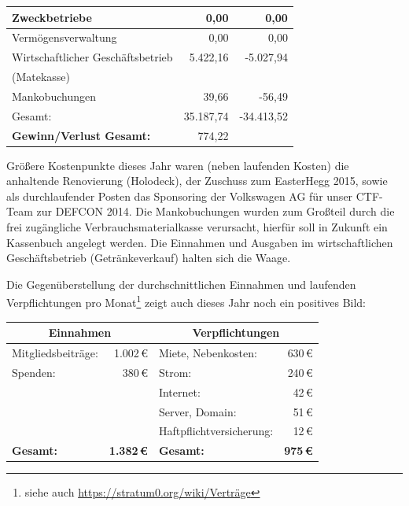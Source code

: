 \documentclass[a4paper,12pt]{scrartcl}
\begin{document}
\begin{longtable}{|l|r|r|}
  \hline
  Zweckbetriebe                     &        0{,}00 &         0{,}00 \\
  \hline
  Vermögensverwaltung               &        0{,}00 &         0{,}00 \\
  \hline
  Wirtschaftlicher Geschäftsbetrieb &  5{.}422{,}16 &  -5{.}027{,}94 \\
  \quad (Matekasse) && \\
  \hline
  Mankobuchungen                    &       39{,}66 &       -56{,}49 \\
  \hline
  Gesamt:                           & 35{.}187{,}74 & -34{.}413{,}52 \\
  \hline\hline
  \textbf{Gewinn/Verlust Gesamt:}   &      774{,}22 &                \\
  \hline
\end{longtable}

Größere Kostenpunkte dieses Jahr waren (neben laufenden Kosten) die anhaltende
Renovierung (Holodeck), der Zuschuss zum EasterHegg 2015, sowie als
durchlaufender Posten das Sponsoring der Volkswagen AG für unser CTF-Team zur
DEFCON 2014.  Die Mankobuchungen wurden zum Großteil durch die frei zugängliche
Verbrauchsmaterialkasse verursacht, hierfür soll in Zukunft ein Kassenbuch
angelegt werden. Die Einnahmen und Ausgaben im wirtschaftlichen Geschäftsbetrieb
(Getränkeverkauf) halten sich die Waage.

Die Gegenüberstellung der durchschnittlichen Einnahmen und laufenden
Verpflichtungen pro Monat\footnote{siehe auch
\url{https://stratum0.org/wiki/Verträge}} zeigt auch dieses Jahr noch ein
positives Bild:

\begin{longtable}{|lr|lr|} %
  \hline
  \multicolumn{2}{|c|}{\textbf{Einnahmen}} &
  \multicolumn{2}{|c|}{\textbf{Verpflichtungen}} \\
  \hline
  Mitgliedsbeiträge: & 1{.}002\,€ & Miete, Nebenkosten:      & 630\,€ \\
  Spenden:           &     380\,€ & Strom:                   & 240\,€ \\
                     &            & Internet:                &  42\,€ \\
                     &            & Server, Domain:          &  51\,€ \\
                     &            & Haftpflichtversicherung: &  12\,€ \\
  \hline\hline
  \textbf{Gesamt:} & \textbf{1{.}382\,€} & \textbf{Gesamt:} & \textbf{975\,€} \\
  \hline
\end{longtable}
\end{document}
